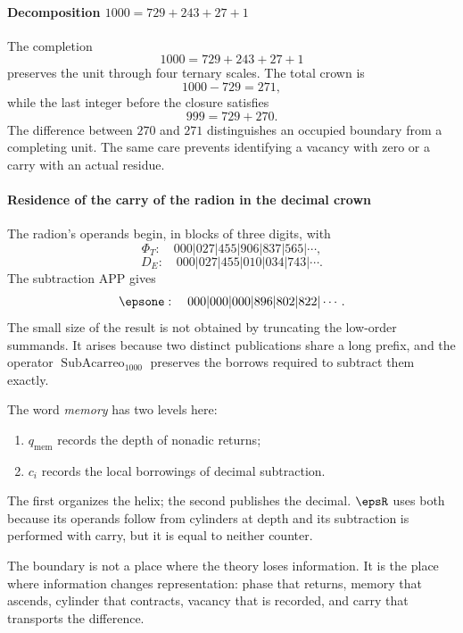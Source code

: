 \paragraph{Decomposition \(1000=729+243+27+1\)}

The completion
\[
1000=729+243+27+1
\]
preserves the unit through four ternary scales. The total crown is
\[
1000-729=271,
\]
while the last integer before the closure satisfies
\[
999=729+270.
\]
The difference between \(270\) and \(271\) distinguishes an occupied boundary from a
completing unit. The same care prevents identifying a vacancy with zero or a
carry with an actual residue.

\paragraph{Residence of the carry of the radion in the decimal crown}

The radion's operands begin, in blocks of three digits, with
\[
\Phi_T:\quad000|027|455|906|837|565|\cdots,
\]
\[
D_E:\quad000|027|455|010|034|743|\cdots.
\]
The subtraction APP gives
\[
\epsone:\quad000|000|000|896|802|822|\cdots.
\]
The small size of the result is not obtained by truncating the low-order
summands. It arises because two distinct publications share a long prefix,
and the operator \(\operatorname{SubAcarreo}_{1000}\) preserves the borrows required to subtract
them exactly.

The word \emph{memory} has two levels here:
\begin{enumerate}
\item \(q_{\mathrm{mem}}\) records the depth of nonadic returns;
\item \(c_i\) records the local borrowings of decimal subtraction.
\end{enumerate}
The first organizes the helix; the second publishes the decimal. \(\epsR\) uses
both because its operands follow from cylinders at depth and its subtraction is
performed with carry, but it is equal to neither counter.

\begin{thesisbox}
The boundary is not a place where the theory loses information. It is the
place where information changes representation: phase that returns, memory
that ascends, cylinder that contracts, vacancy that is recorded, and carry
that transports the difference.
\end{thesisbox}
